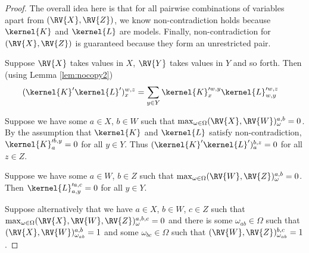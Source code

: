 \begin{proof}
The overall idea here is that for all pairwise combinations of variables apart from $(\RV{X},\RV{Z})$, we know non-contradiction holds because $\kernel{K}$ and $\kernel{L}$ are models. Finally, non-contradiction for $(\RV{X},\RV{Z})$ is guaranteed because they form an unrestricted pair.

Suppose $\RV{X}$ takes values in $X$, $\RV{Y}$ takes values in $Y$ and so forth. Then (using Lemma \ref{lem:nocopy2})
\begin{align}
    (\kernel{K}'\kernel{L}')_{x}^{w,z} &= \sum_{y\in Y} \kernel{K}_x^{\prime w,y} \kernel{L}_{w,y}^{\prime w,z}
\end{align}

Suppose we have some $a\in X$, $b\in W$ such that $\max_{\omega\in \Omega} (\RV{X},\RV{W})_{\omega}^{a,b} = 0$. By the assumption that $\kernel{K}$ and $\kernel{L}$ satisfy non-contradiction, $\kernel{K}_a^{\prime b,y}=0$ for all $y\in Y$. Thus $(\kernel{K}'\kernel{L}')_{a}^{b,z}=0$ for all $z\in Z$.

Suppose we have some $a\in W$, $b\in Z$ such that $\max_{\omega\in \Omega} (\RV{W},\RV{Z})_{\omega}^{a,b} = 0$. Then $\kernel{L}_{a,y}^{\prime a,c}=0$ for all $y\in Y$.

Suppose alternatively that we have $a\in X$, $b\in W$, $c\in Z$ such that $\max_{\omega\in \Omega} (\RV{X},\RV{W},\RV{Z})_{\omega}^{a,b,c} = 0$ and there is some $\omega_{ab}\in \Omega$ such that $(\RV{X},\RV{W})_{\omega_{ab}}^{a,b}=1$ and some $\omega_{bc}\in \Omega$ such that $(\RV{W},\RV{Z})_{\omega_{ab}}^{b,c}=1$. 
\end{proof}